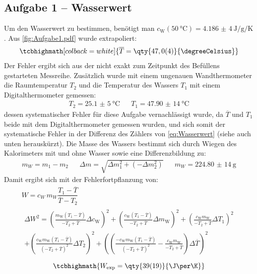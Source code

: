 \subsection{Aufgabe 1 -- Wasserwert}
Um den Wasserwert zu bestimmen, benötigt man \(c_{\text{W}}(\qty{50}{\degreeCelsius}) = \qty{4,186(4)}{\J\per\g\per\K}\)\autocite{Skript_1}. Aus \cref{fig:Aufgabe1.pdf} wurde extrapoliert:
\[\tcbhighmath[colback=white]{\overline{T} = \qty{47,0(4)}{\degreeCelsius}}\]
Der Fehler ergibt sich aus der nicht exakt zum Zeitpunkt des Befüllens gestarteten Messreihe. Zusätzlich wurde mit einem ungenauen Wandthermometer die Raumtemperatur \(T_2\) und die Temperatur des Wassers \(T_1\) mit einem Digitalthermometer gemessen:
\begin{align*}
  T_2 = \qty{25,1(5)}{\degreeCelsius} && T_1 = \qty{47,90(14)}{\degreeCelsius}
\end{align*}
dessen systematischer Fehler für diese Aufgabe vernachlässigt wurde, da \(\overline{T}\) und \(T_1\) beide mit dem Digitalthermometer gemessen wurden, und sich somit der systematische Fehler in der Differenz des Zählers von \cref{eq:Wasserwert} (siehe auch unten herauskürzt). Die Masse des Wassers bestimmt sich durch Wiegen des Kalorimeters mit und ohne Wasser sowie eine Differenzbildung zu:
\begin{align}
  m_W=m_1-m_2&&\Delta m = \sqrt{\Delta m_1^{2} + (-\Delta m_2^2)}&&m_W = \qty{224,80(14)}{\g}
\end{align}
Damit ergibt sich mit der Fehlerfortpflanzung von:
\begin{gather}
      W=c_W\,m_W\dfrac{T_1-\overline{T}}{\overline{T}-T_2}\\
      \begin{split}
        \Delta W^2 = \left(\frac{m_{\text{W}} \left(T_1-\overline{T}\right)}{-T_2+\overline{T}} \Delta c_{\text{W}}\right)^2 + \left(\frac{c_{\text{W}} \left(T_1-\overline{T}\right)}{-T_2+\overline{T}} \Delta m_{\text{W}}\right)^2
        + \left(\frac{c_{\text{W}} m_{\text{W}}}{-T_2+\overline{T}} \Delta T_1\right)^2\\ + \left(\frac{c_{\text{W}} m_{\text{W}} \left(T_1-\overline{T}\right)}{\left(-T_2+\overline{T}\right)^2} \Delta T_2\right)^2
        + \left(\left(\frac{-c_{\text{W}} m_{\text{W}} \left(T_1-\overline{T}\right)}{\left(-T_2+\overline{T}\right)^2} - \frac{c_{\text{W}} m_{\text{W}}}{-T_2+\overline{T}}\right) \Delta\overline{T}\right)^2
      \end{split}
\end{gather}
\[\tcbhighmath{W_{\text{exp}} = \qty{39(19)}{\J\per\K}}\]
